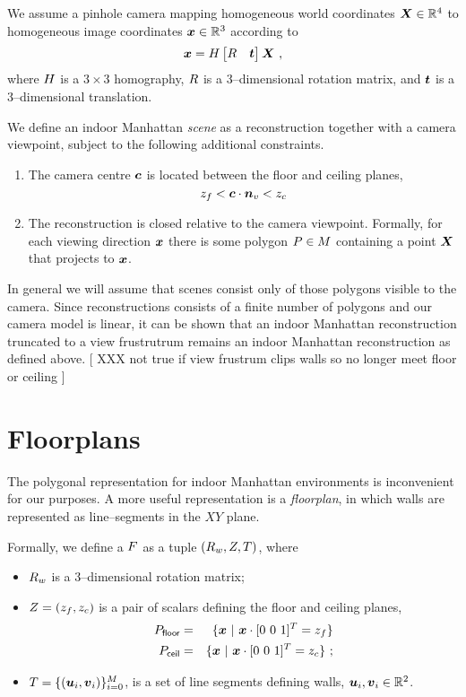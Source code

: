 We assume a pinhole camera mapping homogeneous world coordinates
$\vect{X}\in\Rfour$ to homogeneous image coordinates $\vect{x}\in\Rthree$
according to
\begin{equation}
  \vect{x} = 
  \CamMatrix \begin{bmatrix} \CamR & \CamTr \end{bmatrix} \vect{X} ~,
\end{equation}
where $\CamMatrix$ is a $3 \times 3$ homography, $\CamR$ is a
3--dimensional rotation matrix, and $\CamTr$ is a 3--dimensional
translation.

We define an indoor Manhattan \textit{scene} as a reconstruction
together with a camera viewpoint, subject to the following additional
constraints.
\begin{enumerate}
  \item{The camera centre $\vect{c}$ is located between the floor
    and ceiling planes,
    \begin{equation}
      \zfloor < \vect{c} \cdot \vertnormal < \zceil
    \end{equation}
  }
  \item{The reconstruction is closed relative to the camera
    viewpoint. Formally, for each viewing direction $\vect{x}$ there
    is some polygon $\Poly\in\Reconstruction$ containing a point
    $\vect{X}$ that projects to $\vect{x}$.
  }
\end{enumerate}

In general we will assume that scenes consist only of those polygons
visible to the camera. Since reconstructions consists of a finite
number of polygons and our camera model is linear, it can be shown
that an indoor Manhattan reconstruction truncated to a view
frustrutrum remains an indoor Manhattan reconstruction as defined
above. [ XXX not true if view frustrum clips walls so no longer meet
  floor or ceiling ]

\section{Floorplans}

The polygonal representation for indoor Manhattan environments is
inconvenient for our purposes. A more useful representation is a
\textit{floorplan}, in which walls are represented as line--segments
in the $XY$ plane.

Formally, we define a $\Floorplan$ as a tuple
$(\SceneR,\Zs,\Polyline)$, where
\begin{itemize}
  \item{$\SceneR$ is a 3--dimensional rotation matrix;}
  \item{$\Zs=(\zfloor,\zceil)$ is a pair of scalars defining the floor
    and ceiling planes,
    \begin{eqnarray}
      \Pfloor &=& \{ \vect{x} ~|~ \vect{x} \cdot [0~0~1]^T = \zfloor \}\\
      \Pceil  &=& \{ \vect{x} ~|~ \vect{x} \cdot [0~0~1]^T = \zceil \} ~;
    \end{eqnarray}
  }
  \item{$\Polyline=\{(\startpt_i,\enpt_i)\}_{i=0}^M$, is a set of line
    segments defining walls, $\startpt_i,\enpt_i \in \Rtwo$.}
\end{itemize}

